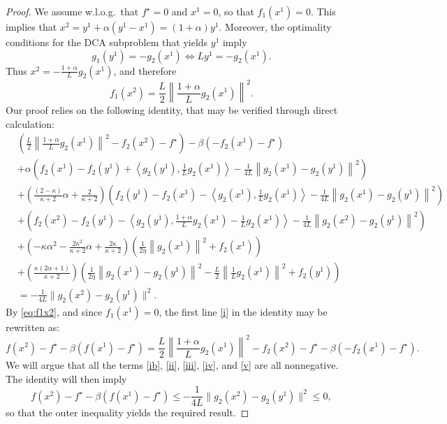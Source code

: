 \documentclass[10pt,a4paper]{amsart}
\begin{document}
\begin{proof}
  We assume w.l.o.g.\ that $f^\star=0$ and $x^1=0$, so that $f_1(x^1) = 0$. This implies that $x^2 = y^1 + \alpha(y^1-x^1) = (1+\alpha)y^1$.
  Moreover, the optimality conditions for the DCA subproblem that yields $y^1$ imply
  \[
  g_1(y^1) = -g_2(x^1) \Longleftrightarrow Ly^1 = - g_2(x^1).
  \]
Thus $x^2 = - \frac{1+\alpha}{L}g_2(x^1)$, and therefore
\begin{equation}
\label{eq:f1x2}
f_1(x^2) = \frac{L}{2}\left\|\frac{1+\alpha}{L}g_2(x^1)\right\|^2.
\end{equation}
   Our proof relies on the following identity, that may be verified through direct calculation:
\begin{align}
&{\left(\frac{L}{2}\left\|\frac{1+\alpha}{L}g_2(x^1)\right\|^2  -f_2(x^2)-f^\star\right)}-\beta\left( {-f_2(x^1)-f^\star} \right) \label{i} \\
&+\alpha \left( f_2(x^1)-f_2(y^{1})+\left\langle g_2(y^{1}), \frac{1}{L}g_2(x^{1})\right\rangle-\tfrac{1}{4L}\left\|g_2(x^1)-g_2(y^{1})\right\|^2\right) \label{ib}\\
&+ \left(\frac{(2-\kappa)}{\kappa+2}\alpha + \frac{2}{\kappa+2}\right) \left( f_2(y^1)-f_2(x^{1})-\left\langle g_2(x^{1}), \frac{1}{L}g_2(x^{1})\right\rangle-\tfrac{1}{4L}\left\|g_2(x^1)-g_2(y^{1})\right\|^2\right) \label{ii}\\
&+\left( f_2(x^2)-f_2(y^{1})-\left\langle g_2(y^{1}), \frac{1+\alpha}{L}g_2(x^1)-\frac{1}{L}g_2(x^{1})\right\rangle-\tfrac{1}{4L}\left\|g_2(x^2)-g_2(y^{1})\right\|^2\right) \label{iii}\\
&+\left(-\kappa\alpha^2 - \frac{2\kappa^2}{\kappa+2}\alpha + \frac{2\kappa}{\kappa+2}\right)\left(\frac{1}{2\eta}\left\|g_2(x^1)\right\|^2+f_2(x^1)\right) \label{iv}\\
&+\left(\frac{\kappa(2\alpha+1)}{\kappa+2}\right)\left(\frac{1}{2\eta}\left\|g_2(x^1)-g_2(y^1)\right\|^2-\frac{L}{2}\left\|\frac{1}{L}g_2(x^1)\right\|^2+f_2(y^1)\right) \label{v}\\
&=-\frac{1}{4L}\|g_2(x^2)-g_2(y^1)\|^2. \nonumber
\end{align}
By \eqref{eq:f1x2}, and since $f_1(x^1) = 0$, the first line \eqref{i} in the identity may be rewritten as:
$$
f(x^2)-f^\star- \beta\left(f(x^1)-f^\star  \right) = \frac{L}{2}\left\|\frac{1+\alpha}{L}g_2(x^1)\right\|^2  -f_2(x^2)-f^\star -\beta\left( {-f_2(x^1)-f^\star} \right).
$$
We will argue that all the terms \eqref{ib}, \eqref{ii}, \eqref{iii}, \eqref{iv}, and \eqref{v} are all nonnegative.
The identity will then imply $$f(x^2)-f^\star- \beta\left(f(x^1)-f^\star  \right) \le -\frac{1}{4L}\|g_2(x^2)-g_2(y^1)\|^2 \le 0,$$
so that the outer inequality yields the required result.


\end{proof}
\end{document}
